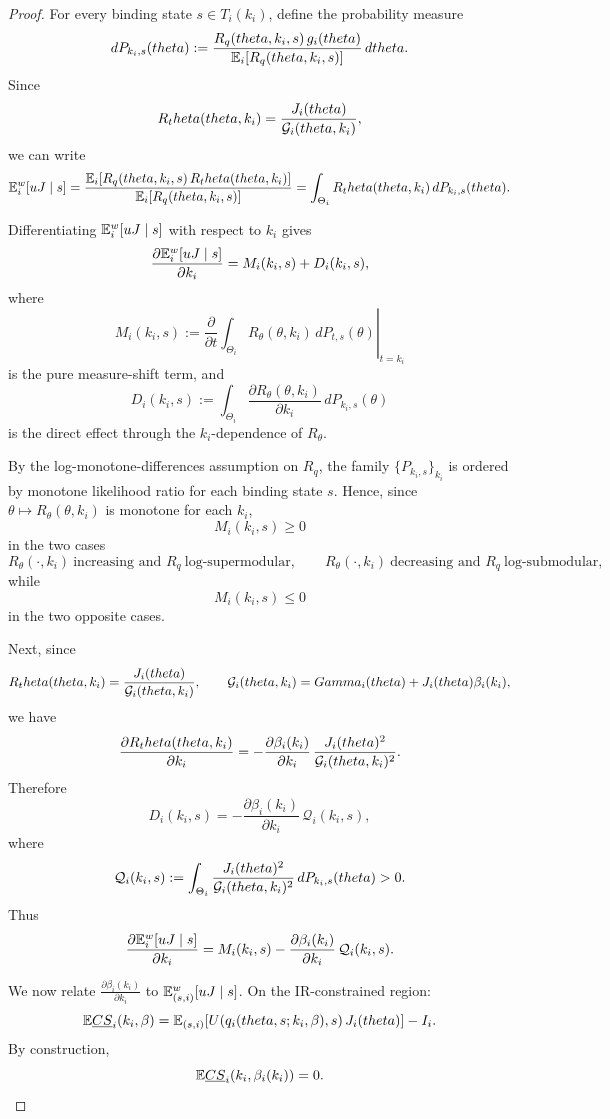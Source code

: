 \documentclass[master.tex]{subfiles}
\begin{document}
\begin{proof}
For every binding state $s\in T_i(k_i)$, define the probability measure
\[
dP_{k_i,s}(theta):=
\frac{R_q(theta,k_i,s)\,g_i(theta)}
{\mathbb{E}_i[R_q(theta,k_i,s)]}\,dtheta.
\]
Since
\[
R_theta(theta,k_i)=\frac{J_i(theta)}{\mathcal{G}_i(theta,k_i)},
\]
we can write
\[
\mathsf {\mathbb{E}}_i^w[uJ\mid s]
=
\frac{\mathbb{E}_i\!\left[R_q(theta,k_i,s)\,R_theta(theta,k_i)\right]}
{\mathbb{E}_i\!\left[R_q(theta,k_i,s)\right]}
=
\int_{\Theta_i} R_theta(theta,k_i)\,dP_{k_i,s}(theta).
\]

Differentiating $\mathsf {\mathbb{E}}_i^w[uJ\mid s]$ with respect to $k_i$ gives
\[
\frac{\partial \mathsf {\mathbb{E}}_i^w[uJ\mid s]}{\partial k_i}
=
M_i(k_i,s)+D_i(k_i,s),
\]
where
\[
M_i(k_i,s)
:=
\left.
\frac{\partial}{\partial t}
\int_{\Theta_i}R_\theta(\theta,k_i)\,dP_{t,s}(\theta)
\right|_{t=k_i}
\]
is the pure measure-shift term, and
\[
D_i(k_i,s)
:=
\int_{\Theta_i}
\frac{\partial R_\theta(\theta,k_i)}{\partial k_i}\,dP_{k_i,s}(\theta)
\]
is the direct effect through the $k_i$-dependence of $R_\theta$.

By the log-monotone-differences assumption on $R_q$, the family $\{P_{k_i,s}\}_{k_i}$ is ordered by monotone likelihood ratio for each binding state $s$. Hence, since $\theta\mapsto R_\theta(\theta,k_i)$ is monotone for each $k_i$,
\[
M_i(k_i,s)\ge 0
\]
in the two cases
\[
R_\theta(\cdot,k_i)\ \text{increasing and }R_q\ \text{log-supermodular},
\qquad
R_\theta(\cdot,k_i)\ \text{decreasing and }R_q\ \text{log-submodular},
\]
while
\[
M_i(k_i,s)\le 0
\]
in the two opposite cases.

Next, since
\[
R_theta(theta,k_i)=\frac{J_i(theta)}{\mathcal{G}_i(theta,k_i)},
\qquad
\mathcal{G}_i(theta,k_i)=Gamma_i(theta)+J_i(theta)\beta_i(k_i),
\]
we have
\[
\frac{\partial R_theta(theta,k_i)}{\partial k_i}
=
-\frac{\partial \beta_i(k_i)}{\partial k_i}\,
\frac{J_i(theta)^2}{\mathcal{G}_i(theta,k_i)^2}.
\]
Therefore
\[
D_i(k_i,s)
=
-\frac{\partial \beta_i(k_i)}{\partial k_i}\,\mathcal Q_i(k_i,s),
\]
where
\[
\mathcal Q_i(k_i,s)
:=
\int_{\Theta_i}
\frac{J_i(theta)^2}{\mathcal{G}_i(theta,k_i)^2}\,dP_{k_i,s}(theta)
>0.
\]
Thus
\[
\frac{\partial \mathsf {\mathbb{E}}_i^w[uJ\mid s]}{\partial k_i}
=
M_i(k_i,s)-\frac{\partial \beta_i(k_i)}{\partial k_i}\,\mathcal Q_i(k_i,s).
\]

We now relate $\frac{\partial \beta_i(k_i)}{\partial k_i}$ to $\mathbb{E}_{(s,i)}^w[uJ\mid s]$. On the IR-constrained region:
\[
\mathbb{E} \underline{CS}_i(k_i,\beta)
=
\mathbb{E}_{(s,i)}\!\left[ U\!\left(q_i(theta,s;k_i,\beta),s\right)J_i(theta)
\right]
-I_i.
\]
By construction,
\[
\mathbb{E} \underline{CS}_i\!\left(k_i,\beta_i(k_i)\right)=0.
\]


\end{proof}
\end{document}
